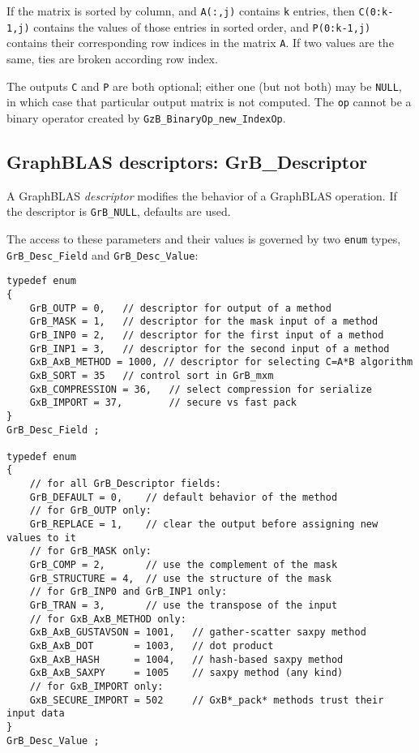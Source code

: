 \documentclass[12pt]{article}
\begin{document}
If the matrix is sorted by column, and \verb'A(:,j)' contains \verb'k' entries,
then \verb'C(0:k-1,j)' contains the values of those entries in sorted order,
and \verb'P(0:k-1,j)' contains their corresponding row indices in the matrix
\verb'A'.  If two values are the same, ties are broken according row index.

The outputs \verb'C' and \verb'P' are both optional; either one (but not both)
may be \verb'NULL', in which case that particular output matrix is not
computed.
%
The \verb'op' cannot be a binary operator
created by \verb'GzB_BinaryOp_new_IndexOp'.

\newpage
\subsection{GraphBLAS descriptors: {\sf GrB\_Descriptor}} %
\label{descriptor}

A GraphBLAS {\em descriptor} modifies the behavior of a GraphBLAS operation.
If the descriptor is \verb'GrB_NULL', defaults are used.

The access to these parameters and their values is governed
by two \verb'enum' types, \verb'GrB_Desc_Field' and \verb'GrB_Desc_Value':

\begin{mdframed}[userdefinedwidth=6in]
{\footnotesize
\begin{verbatim}
typedef enum
{
    GrB_OUTP = 0,   // descriptor for output of a method
    GrB_MASK = 1,   // descriptor for the mask input of a method
    GrB_INP0 = 2,   // descriptor for the first input of a method
    GrB_INP1 = 3,   // descriptor for the second input of a method
    GxB_AxB_METHOD = 1000, // descriptor for selecting C=A*B algorithm
    GxB_SORT = 35   // control sort in GrB_mxm
    GxB_COMPRESSION = 36,   // select compression for serialize
    GxB_IMPORT = 37,        // secure vs fast pack
}
GrB_Desc_Field ;

typedef enum
{
    // for all GrB_Descriptor fields:
    GrB_DEFAULT = 0,    // default behavior of the method
    // for GrB_OUTP only:
    GrB_REPLACE = 1,    // clear the output before assigning new values to it
    // for GrB_MASK only:
    GrB_COMP = 2,       // use the complement of the mask
    GrB_STRUCTURE = 4,  // use the structure of the mask
    // for GrB_INP0 and GrB_INP1 only:
    GrB_TRAN = 3,       // use the transpose of the input
    // for GxB_AxB_METHOD only:
    GxB_AxB_GUSTAVSON = 1001,   // gather-scatter saxpy method
    GxB_AxB_DOT       = 1003,   // dot product
    GxB_AxB_HASH      = 1004,   // hash-based saxpy method
    GxB_AxB_SAXPY     = 1005    // saxpy method (any kind)
    // for GxB_IMPORT only:
    GxB_SECURE_IMPORT = 502     // GxB*_pack* methods trust their input data
}
GrB_Desc_Value ;
\end{verbatim} } \end{mdframed}
\end{document}
